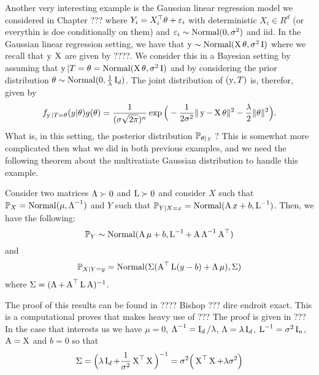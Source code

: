 Another very interesting example is the Gaussian linear regression model we considered in Chapter ??? where
$Y_i = X_i^\top \theta + \eps_i$ with deterministic $X_i \in R^d$ (or everythin is doe conditionally on them) and $\eps_i \sim \nor(0, \sigma^2)$ and iid.
In the Gaussian linear regression setting, we have that $\by \sim \nor(\bX \theta, \sigma^2 \bI)$ where we recall that $\by$ $\bX$ are given by ????.
We consider this in a Bayesian setting by assuming that $\by | T = \theta = \nor(\bX \theta, \sigma^2 \bI)$ and by considering the prior distribution $\theta \sim \nor(0, \frac{1}{\lambda} \bI_d)$.
The joint distribution of $(\by, T)$ is, therefor, given by
\begin{equation*}
	f_{\by | T = \theta}(y | \theta) g(\theta) = \frac{1}{(\sigma \sqrt{2 \pi})^{n}} 
	\exp \Big( -\frac{1}{2 \sigma^2} \norm{\by - \bX \theta}^2 - \frac {\lambda}{2} \norm{\theta}^2 \Big).
\end{equation*}
What is, in this setting, the posterior distribution $\P_{\theta | \by}$ ?
This is somewhat more complicated then what we did in both previous examples, and we need the following theorem about the multivatiate Gaussian distribution to handle this example.
\begin{theorem}
	Consider two matrices $\bLambda \succ 0$ and $\bL \succ 0$ and consider 
	$X$ such that $\P_X = \nor(\mu, \bLambda^{-1})$ and $Y$ such that $\P_{Y | X = x} = \nor(\bA x + b, \bL^{-1})$. Then, we have the following:
	\begin{equation*}
		\P_Y \sim \nor( \bA \mu + b, \bL^{-1} + \bA \bLambda^{-1} \bA^\top)		
	\end{equation*}
	and
	\begin{equation*}
		\P_{X | Y = y} = \nor(\bSigma (\bA^\top \bL (y - b) + \bLambda \mu), \bSigma)
	\end{equation*}
	where $\bSigma = (\bLambda + \bA^\top \bL \bA)^{-1}$.
\end{theorem}
The proof of this results can be found in ???? Bishop ??? dire endroit exact.
This is a computational proves that makes heavy use of ???
 The proof is given in ???
In the case that interests us we have $\mu = 0$, $\bLambda^{-1} = \bI_d / \lambda$, $\bLambda = \lambda \bI_d$, $\bL^{-1} = \sigma^2 \bI_n$, $\bA = \bX$ and $b = 0$ so that
\begin{equation*}
	\bSigma = \Big( \lambda \bI_d + \frac{1}{\sigma^2} \bX^\top \bX \Big)^{-1} = \sigma^2 \Big( \bX^\top \bX  + \lambda \sigma^2 \Big)
\end{equation*}

